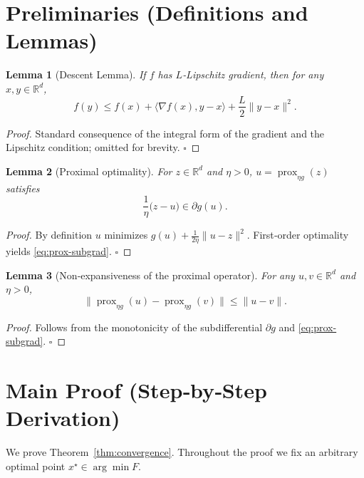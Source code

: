 \documentclass{article}
\newtheorem{lemma}{Lemma}
\newcommand{\prox}{\operatorname{prox}}
\newcommand{\grad}{\nabla}
\newcommand{\R}{\mathbb{R}}
\begin{document}
\section*{Preliminaries (Definitions and Lemmas)}
\begin{lemma}[Descent Lemma]
\label{lem:descent}
If $f$ has $L$‑Lipschitz gradient, then for any $x,y\in\R^{d}$,
\begin{equation}
\label{eq:descent}
f(y)\le f(x)+\langle\grad f(x),y-x\rangle+\frac{L}{2}\|y-x\|^{2}.
\end{equation}
\end{lemma}
\begin{proof}
Standard consequence of the integral form of the gradient and the
Lipschitz condition; omitted for brevity. \hfill $\square$
\end{proof}
\begin{lemma}[Proximal optimality]
\label{lem:prox-opt}
For $z\in\R^{d}$ and $\eta>0$, $u=\prox_{\eta g}(z)$ satisfies
\begin{equation}
\label{eq:prox-subgrad}
\frac{1}{\eta}\bigl(z-u\bigr)\in\partial g(u).
\end{equation}
\end{lemma}
\begin{proof}
By definition $u$ minimizes $g(u)+\frac{1}{2\eta}\|u-z\|^{2}$.
First‑order optimality yields \eqref{eq:prox-subgrad}. \hfill $\square$
\end{proof}
\begin{lemma}[Non‑expansiveness of the proximal operator]
\label{lem:nonexp}
For any $u,v\in\R^{d}$ and $\eta>0$,
\[
\|\prox_{\eta g}(u)-\prox_{\eta g}(v)\|\le\|u-v\|.
\]
\end{lemma}
\begin{proof}
Follows from the monotonicity of the subdifferential $\partial g$ and
\eqref{eq:prox-subgrad}. \hfill $\square$
\end{proof}

\section*{Main Proof (Step‑by‑Step Derivation)}
We prove Theorem~\ref{thm:convergence}. Throughout the proof we fix an
arbitrary optimal point $x^{\star}\in\arg\min F$.
\end{document}
